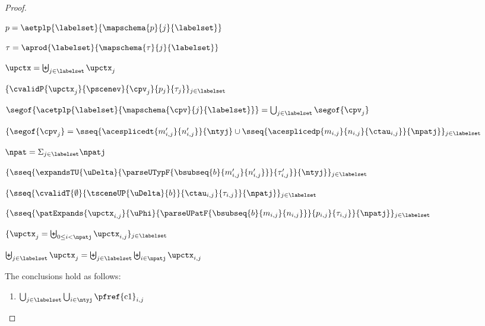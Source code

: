\begin{grayparbox}
\begin{proof}
\begin{byCases}
\begin{pfsteps*}
      \item $p=\aetplp{\labelset}{\mapschema{p}{j}{\labelset}}$ 
      \item $\tau = \aprod{\labelset}{\mapschema{\tau}{j}{\labelset}}$ 
      \item $\upctx=\biguplus_{j \in \labelset}{\upctx_j}$  
      \item $\{\cvalidP{\upctx_j}{\pscenev}{\cpv_j}{p_j}{\tau_j}\}_{j \in \labelset}$  
      \item $\segof{\acetplp{\labelset}{\mapschema{\cpv}{j}{\labelset}}} = \bigcup_{j \in \labelset} \segof{\cpv_j}$ 
      \item $\{ \segof{\cpv_j} = \sseq{\acesplicedt{m'_{i,j}}{n'_{i,j}}}{\ntyj} \cup \sseq{\acesplicedp{m_{i,j}}{n_{i,j}}{\ctau_{i,j}}}{\npatj} \}_{j \in \labelset}$ 
      \item $\npat = \Sigma_{j \in \labelset} \npatj$ 
      \item $\{\sseq{
            \expandsTU{\uDelta}
            {
              \parseUTypF{\bsubseq{b}{m'_{i,j}}{n'_{i,j}}}
            }{\tau'_{i,j}}
          }{\ntyj}\}_{j \in \labelset}$  
      \item $\{\sseq{
        \cvalidT{\emptyset}{
          \tsceneUP
            {\uDelta}{b}
        }{
          \ctau_{i,j}
        }{\tau_{i,j}}
      }{\npatj}\}_{j \in \labelset}$  
      \item $\{\sseq{
        \patExpands
          {\upctx_{i,j}}
          {\uPhi}
          {\parseUPatF{\bsubseq{b}{m_{i,j}}{n_{i,j}}}}
          {p_{i,j}}
          {\tau_{i,j}}
      }{\npatj}\}_{j \in \labelset}$  
    \item $\{\upctx_j = \biguplus_{0 \leq i < \npatj} \upctx_{i,j}\}_{j \in \labelset}$ 
    \item $\biguplus_{j \in \labelset} \upctx_{j} = \biguplus_{j \in \labelset} \biguplus_{i \in \npatj} \upctx_{i,j}$ 
    \end{pfsteps*}
    The conclusions hold as follows:
    \begin{enumerate}
      \item $\bigcup_{j \in \labelset} \bigcup_{i \in \ntyj} \text{\pfref{c1}}_{i,j}$

\end{enumerate}
\end{byCases}
\end{proof}
\end{grayparbox}
